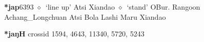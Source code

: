   \begin{list}{}{\leftmargin=1.5em \itemindent=-1.5em}
  \item {\footnotesize \textbf{*jap}}{\tiny 6393}
         $\diamond$~`line up'
         Atsi 
\hspace{1ex}
         Xiandao 
\hspace{1ex}
         $\diamond$~`stand'
         OBur. 
\hspace{1ex}
         Rangoon 
\hspace{1ex}
         Achang\_Longchuan 
\hspace{1ex}
         Atsi 
\hspace{1ex}
         Bola 
\hspace{1ex}
         Lashi 
\hspace{1ex}
         Maru 
\hspace{1ex}
         Xiandao 
  \end{list}
\item
\textbf{*jaŋH}
  {\tiny crossid 1594, 4643, 11340, 5720, 5243}
